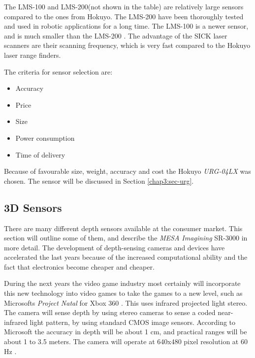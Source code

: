 The LMS-100 and LMS-200(not shown in the table) are relatively large sensors compared to
the ones from Hokuyo. The LMS-200 have been thoroughly tested and used in robotic
applications for a long time. The LMS-100 is a newer sensor, and is much smaller than the
LMS-200 \cite{SICKweb}. The advantage of the SICK laser scanners are their scanning
frequency, which is very fast compared to the Hokuyo laser range finders.

The criteria for sensor selection are:
\begin{itemize}
    \item Accuracy
    \item Price
    \item Size
    \item Power consumption
    \item Time of delivery
\end{itemize}
Because of favourable size, weight, accuracy and cost the Hokuyo \emph{URG-04LX} was
chosen. The sensor will be discussed in Section \ref{chap3:sec-urg}.

\subsection{3D Sensors}
There are many different depth sensors available at the consumer market. This section will
outline some of them, and describe the \emph{MESA Imagining} SR-3000 in more detail.
The development of depth-sensing cameras and devices have accelerated the last years
because of the increased computational ability and the fact that electronics become
cheaper and cheaper. \cite{low-cost-depthcameras}

During the next years the video game industry most certainly will
incorporate this new technology into video games to take the games to a new level, such as
Microsofts \emph{Project Natal} for Xbox 360 \cite{project-natal}. This uses infrared
projected light stereo. The camera will sense depth by using stereo cameras to sense a
coded near-infrared light pattern, by using standard CMOS image sensors. According to
Microsoft the accuracy in depth will be about 1 cm, and practical ranges will be about
1 to 3.5 meters. The camera will operate at 640x480 pixel resolution at 60 Hz
\cite{conceivably-tech}.



